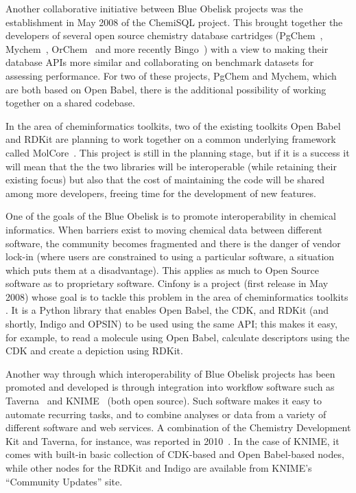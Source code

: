 \documentclass[10pt]{bmc_article}
\newenvironment{bmcformat}{\begin{raggedright}\baselineskip20pt\sloppy\setboolean{publ}{false}}{\end{raggedright}\baselineskip20pt\sloppy}
\begin{document}
\begin{bmcformat}
Another collaborative initiative between Blue Obelisk projects was the establishment in May 2008 of
the ChemiSQL project. This brought together the developers of several
open source chemistry database cartridges (PgChem~\cite{WebPgChem},
Mychem~\cite{WebMychem}, OrChem~\cite{RijnbeekS10} and
more recently Bingo~\cite{WebBingo}) with a view to making their database APIs more
similar and collaborating on benchmark datasets for assessing
performance. For two of these projects, PgChem and Mychem, which are both based on
Open Babel, there is the additional possibility of working together on a shared
codebase.

In the area of cheminformatics toolkits, two of the existing toolkits
Open Babel and RDKit are planning to work together on a common
underlying framework called MolCore~\cite{WebMolCore}. This project is still in the
planning stage, but if it is a success it will mean that the the two
libraries will be interoperable (while retaining their existing focus)
but also that the cost of maintaining the code will be shared among
more developers, freeing time for the development of new features.

One of the goals of the Blue Obelisk is to promote interoperability in chemical
informatics. When barriers exist to moving chemical data between
different software, the community becomes fragmented and there is
the danger of vendor lock-in (where users are constrained to using
a particular software, a situation which puts them at a
disadvantage). This applies as much to Open Source software as to
proprietary software. Cinfony is a project (first release in May 2008)
whose goal is to tackle this problem in the area of cheminformatics
toolkits \cite{OBoyleCinfony2008}.
It is a Python library that enables Open Babel, the CDK, and RDKit
(and shortly, Indigo and OPSIN) to
be used using the same API; this makes it easy, for example, to read a
molecule using Open Babel, calculate descriptors using the CDK and
create a depiction using RDKit.

Another way through which interoperability of Blue Obelisk projects
has been promoted and developed is through integration into
workflow software such as Taverna~\cite{Hull:2006p60} and
KNIME~\cite{WebKNIME} (both open source).
Such software makes it easy to automate recurring
tasks, and to combine analyses or data from a variety of different software
and web services.
A combination of the Chemistry Development Kit and Taverna, for instance, was
reported in 2010~\cite{Kuhn:2010p4001}. 
In the case of KNIME, it comes with built-in basic collection of CDK-based and
Open Babel-based nodes, while other nodes for the RDKit and Indigo are
available from KNIME's ``Community Updates'' site.



\end{bmcformat}
\end{document}
